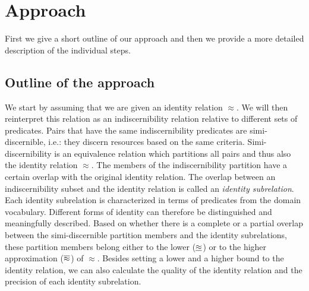 \section{Approach}
\label{sec:approach}

First we give a short outline of our approach and then
  we provide a more detailed description of the individual steps.

\subsection{Outline of the approach}

We start by assuming that we are given an identity relation $\approx$.
We will then reinterpret this relation as an indiscernibility relation
  relative to different sets of predicates.
Pairs that have the same indiscernibility predicates
  are simi-discernible, i.e.: they discern resources
  based on the same criteria.
Simi-discernibility is an equivalence relation
  which partitions all pairs and thus also the identity relation $\approx$.
The members of the indiscernibility partition
  have a certain overlap with the original identity relation.
The overlap between an indiscernibility subset and the identity relation
  is called an \emph{identity subrelation}.
Each identity subrelation is characterized in terms of predicates
  from the domain vocabulary.
Different forms of identity can therefore be distinguished
  and meaningfully described.
Based on whether there is a complete or a partial overlap
  between the simi-discernible partition members and
  the identity subrelations,
  these partition members belong either to the lower ($\underline{\approx}$)
  or to the higher approximation ($\overline{\approx}$) of $\approx$.
Besides setting a lower and a higher bound to the identity relation,
  we can also calculate the quality of the identity relation
  and the precision of each identity subrelation.





